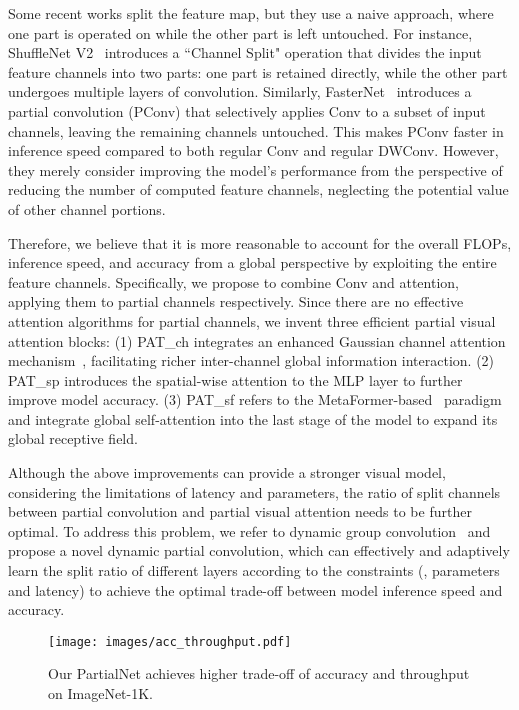 Some recent works split the feature map, but they use a naive approach, where one part is operated on while the other part is left untouched. For instance, ShuffleNet V2~\cite{Ma2018} introduces a ``Channel Split" operation that divides the input feature channels into two parts: one part is retained directly, while the other part undergoes multiple layers of convolution. Similarly, FasterNet~\cite{Chen2023} introduces a partial convolution (PConv) that selectively applies Conv to a subset of input channels, leaving the remaining channels untouched. This makes PConv faster in inference speed compared to both regular Conv and regular DWConv. However, they merely consider improving the model's performance from the perspective of reducing the number of computed feature channels, neglecting the potential value of other channel portions. 

Therefore, we believe that it is more reasonable to account for the overall FLOPs, inference speed, and accuracy from a global perspective by exploiting the entire feature channels. Specifically, we propose to combine Conv and attention, applying them to partial channels respectively. Since there are no effective attention algorithms for partial channels, we invent three efficient partial visual attention blocks: (1) PAT\_ch integrates an enhanced Gaussian channel attention mechanism~\cite{Hu2018}, facilitating richer inter-channel global information interaction. (2) PAT\_sp introduces the spatial-wise attention to the MLP layer to further improve model accuracy. (3) PAT\_sf refers to the MetaFormer-based~\cite{Yu2022a} paradigm and integrate global self-attention into the last stage of the model to expand its global receptive field. 

Although the above improvements can provide a stronger visual model, considering the limitations of latency and parameters, the ratio of split channels between partial convolution and partial visual attention needs to be further optimal. To address this problem, we refer to dynamic group convolution~\cite{Zhang2019c} and propose a novel dynamic partial convolution, which can effectively and adaptively learn the split ratio of different layers according to the constraints (\eg, parameters and latency) to achieve the optimal trade-off between model inference speed and accuracy.

\begin{figure}[ht]
  \centering
  \texttt{[image: images/acc\_throughput.pdf]}
  \caption{Our PartialNet achieves higher trade-off of accuracy and throughput on ImageNet-1K.}
  \label{fig:acc_throughput}
\end{figure}

